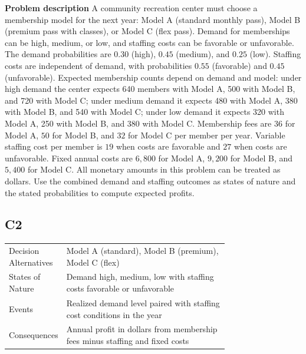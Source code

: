 	\begin{ExamProblems}
		\item
		\textbf{Problem description}
		A community recreation center must choose a membership model for the next year: Model A (standard monthly pass),
		Model B (premium pass with classes), or Model C (flex pass). Demand for memberships can be high, medium, or low, and staffing costs can be favorable or unfavorable. The demand probabilities are $0.30$ (high), $0.45$ (medium), and $0.25$ (low). Staffing costs are independent of demand, with probabilities $0.55$ (favorable) and $0.45$ (unfavorable). Expected membership counts depend on demand and model: under high demand the center expects 640 members with Model A, 500 with Model B, and 720 with Model C; under medium demand it expects 480 with Model A, 380 with Model B, and 540 with Model C; under low demand it expects 320 with Model A, 250 with Model B, and 380 with Model C. Membership fees are $36$ for Model A, $50$ for Model B, and $32$ for Model C per member per year. Variable staffing cost per member is $19$ when costs are favorable and $27$ when costs are unfavorable. Fixed annual costs are $6{,}800$ for Model A, $9{,}200$ for Model B, and $5{,}400$ for Model C. All monetary amounts in this problem can be treated as dollars. Use the combined demand and staffing outcomes as states of nature and the stated probabilities to compute expected profits.

		\subsection*{C2}
		\begin{center}
			\begin{tabular}{l p{0.74\linewidth}}
				\toprule
				Decision Alternatives & Model A (standard), Model B (premium), Model C (flex) \\
				States of Nature & Demand high, medium, low with staffing costs favorable or unfavorable \\
				Events & Realized demand level paired with staffing cost conditions in the year \\
				Consequences & Annual profit in dollars from membership fees minus staffing and fixed costs \\
				\bottomrule
			\end{tabular}
		\end{center}


\end{ExamProblems}
